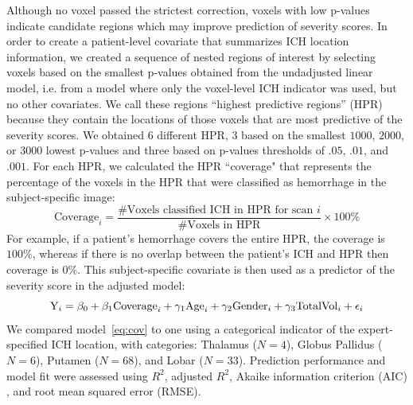 \documentclass[10pt]{article}\usepackage[]{graphicx}\usepackage[]{color}
\begin{document}
Although no voxel passed the strictest correction, voxels with low p-values indicate candidate regions which may improve prediction of severity scores.  In order to create a patient-level covariate that summarizes ICH location information, we created a sequence of nested regions of interest by selecting voxels based on the smallest p-values obtained from the undadjusted linear model, i.e. from a model where only the voxel-level ICH indicator was used, but no other covariates.  We call these regions ``highest predictive regions'' (HPR) because they contain the locations of those voxels that are most predictive of the severity scores. 
We obtained $6$ different HPR, $3$ based on the smallest $1000$, $2000$, or $3000$ lowest p-values and three based on p-values thresholds of $.05$, $.01$, and $.001$. For each HPR, we calculated the HPR ``coverage" that represents the percentage of the voxels in the HPR that were classified as hemorrhage in the subject-specific image: 
$$
\text{Coverage}_i = \frac{\text{\# Voxels classified ICH in HPR for scan } i}{\text{\# Voxels in HPR}} \times 100\% \nonumber
$$
For example, if a patient's hemorrhage covers the entire HPR, the coverage is $100\%$, whereas if there is no overlap between the patient's ICH and HPR then coverage is 0\%.  This subject-specific covariate is then used as a predictor of the severity score in the adjusted model:
\begin{equation}
{\rm Y}_i = \beta_0 + \beta_1 {\rm Coverage}_i + \gamma_1{\rm Age}_i  +\gamma_2{\rm Gender}_i +\gamma_3{\rm TotalVol}_i + \epsilon_{i} \label{eq:cov}
\end{equation}
We compared model~\eqref{eq:cov} to one using a categorical indicator of the expert-specified ICH location, with categories: Thalamus ($N = 4$), Globus Pallidus ($N = 6$), Putamen ($N = 68$), and Lobar ($N = 33$).  
Prediction performance and model fit were assessed using $R^2$, adjusted $R^2$, Akaike information criterion (AIC) \citep{akaike_information_1973}, 
and root mean squared error (RMSE).  
\end{document}

